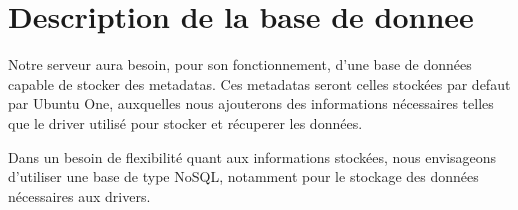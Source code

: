 \section{Description de la base de donnee}
Notre serveur aura besoin, pour son fonctionnement, d'une base de données capable de stocker des metadatas.
Ces metadatas seront celles stockées par defaut par Ubuntu One, auxquelles nous ajouterons des informations nécessaires telles que le driver utilisé pour stocker et récuperer les données.

Dans un besoin de flexibilité quant aux informations stockées, nous envisageons d'utiliser une base de type NoSQL, notamment pour le stockage des données nécessaires aux drivers.
